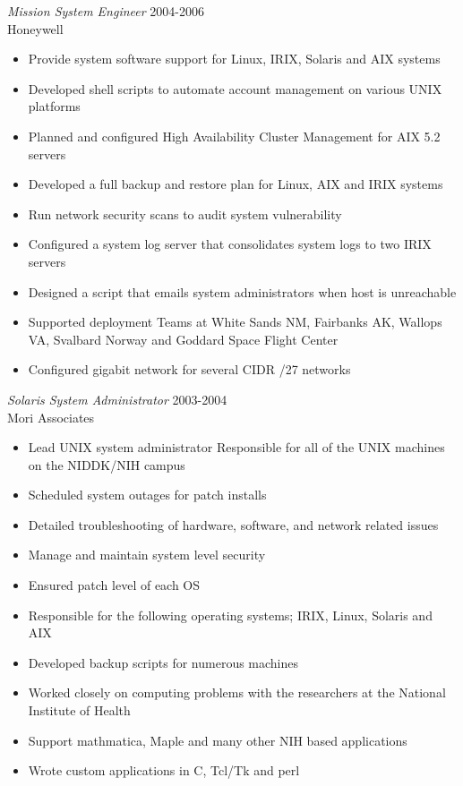 \documentclass[margin, 10pt]{res} %
\begin{document}
\begin{resume}
{\sl Mission System Engineer } \hfill 2004-2006 \\
Honeywell
\begin{itemize}
  \item Provide system software support for Linux, IRIX, Solaris and AIX systems
  \item Developed shell scripts to automate account management on various UNIX platforms
  \item Planned and configured High Availability Cluster Management for AIX 5.2 servers
  \item Developed a full backup and restore plan for Linux, AIX and IRIX systems
  \item Run network security scans to audit system vulnerability
  \item Configured a system log server that consolidates system logs to two IRIX servers
  \item Designed a script that emails system administrators when host is unreachable
  \item Supported deployment Teams at White Sands NM, Fairbanks AK, Wallops VA, Svalbard Norway and Goddard Space Flight Center
  \item Configured gigabit network for several CIDR /27 networks
\end{itemize}

{\sl Solaris System Administrator} \hfill 2003-2004 \\
Mori Associates
\begin{itemize}
  \item Lead UNIX system administrator Responsible for all of the UNIX machines on the NIDDK/NIH campus
  \item Scheduled system outages for patch installs
  \item Detailed troubleshooting of hardware, software, and network related issues
  \item Manage and maintain system level security
  \item Ensured patch level of each OS
  \item Responsible for the following operating systems; IRIX, Linux, Solaris and AIX
  \item Developed backup scripts for numerous machines
  \item Worked closely on computing problems with the researchers at the National Institute of Health
  \item Support mathmatica, Maple and many other NIH based applications
  \item Wrote custom applications in C, Tcl/Tk and perl
\end{itemize}


\end{resume}
\end{document}
